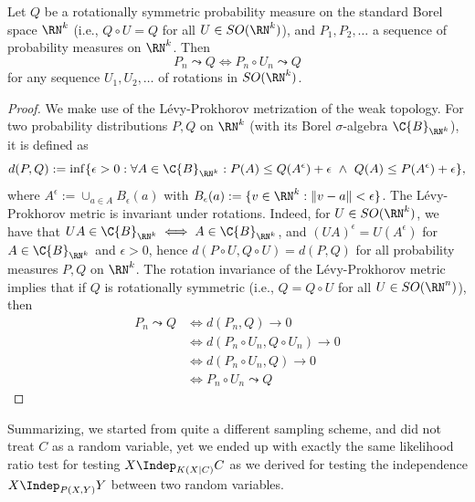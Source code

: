 \begin{Lem}\label{lem:weak_convergence_to_rotationally_symmetric_distribution}
  Let $Q$ be a rotationally symmetric probability measure on the standard Borel space $\RN^k$ (i.e., $Q \circ U = Q$ for all $U \in SO(\RN^k)$),
  and $P_1,P_2,\dots$ a sequence of probability measures on $\RN^k$. Then
  $$P_n \leadsto Q \iff P_n \circ U_n \leadsto Q$$
  for any sequence $U_1,U_2,\dots$ of rotations in $SO(\RN^k)$.
\end{Lem}
\begin{proof}
  We make use of the L\'evy-Prokhorov metrization of the weak topology. For two probability distributions $P,Q$ on
  $\RN^k$ (with its Borel $\sigma$-algebra $\C{B}_{\RN^k}$), 
  it is defined as
  $$d(P,Q) := \inf \{ \epsilon > 0 : \forall A \in \C{B}_{\RN^k} : P(A) \le Q(A^\epsilon) + \epsilon \ \land\ Q(A) \le P(A^\epsilon) + \epsilon \},$$
  where $A^\epsilon := \cup_{a \in A} B_\epsilon(a)$ with $B_\epsilon(a) := \{v \in \RN^k : \lVert v - a \rVert < \epsilon\}$.
  The L\'evy-Prokhorov metric is invariant under rotations. 
  Indeed, for $U \in SO(\RN^k)$, we have that $UA \in \C{B}_{\RN^k} \iff A \in \C{B}_{\RN^k}$, and $(UA)^\epsilon = U(A^\epsilon)$ for $A \in \C{B}_{\RN^k}$ and $\epsilon > 0$, hence $d(P\circ U, Q\circ U) = d(P,Q)$ for all probability measures $P,Q$ on $\RN^k$. 
  The rotation invariance of the L\'evy-Prokhorov metric implies that if $Q$ is rotationally symmetric (i.e., $Q = Q \circ U$ for all $U \in SO(\RN^n)$), then
  \begin{equation*}\begin{split}
    P_n \leadsto Q 
    &\iff d(P_n,Q) \to 0 \\
    &\iff d(P_n \circ U_n,Q \circ U_n) \to 0 \\
    &\iff d(P_n \circ U_n, Q) \to 0 \\
    &\iff P_n \circ U_n \leadsto Q
  \end{split}\end{equation*}
\end{proof}

Summarizing, we started from quite a different sampling scheme, and did not treat $C$ as a random variable, yet we
ended up with exactly the same likelihood ratio test for testing $X \Indep_{K(X|C)} C$ as we derived 
for testing the independence $X \Indep_{P(X,Y)} Y$ between two random variables.

